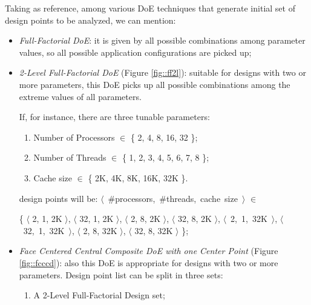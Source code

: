 Taking \cite{natrella2013nist} as reference, among various DoE techniques that generate initial set of design points to be analyzed, we can mention:

\begin{itemize}

    \item \textit{Full-Factorial DoE}: it is given by all possible combinations among parameter values, so all possible application configurations are picked up;
 
    \item \textit{2-Level Full-Factorial DoE} (Figure \ref{fig::ff2l}): suitable for designs with two or more parameters, this DoE picks up all possible combinations among the extreme values of all parameters.
    
    If, for instance, there are three tunable parameters:
    
    \begin{enumerate}
    
        \item Number of Processors $\in$ \{ 2, 4, 8, 16, 32 \};
        
        \item Number of Threads $\in$ \{ 1, 2, 3, 4, 5, 6, 7, 8 \};
        
        \item Cache size $\in$ \{ 2K, 4K, 8K, 16K, 32K \}.
    
    \end{enumerate}
    
    design points will be: \hbox{$\langle$ \#processors, \#threads, cache size $\rangle$} $\in$
    
    \{ $\langle$ 2, 1, 2K $\rangle$, $\langle$ 32, 1, 2K $\rangle$, $\langle$ 2, 8, 2K $\rangle$, $\langle$ 32, 8, 2K $\rangle$, \hbox{$\langle$ 2, 1, 32K $\rangle$}, \hbox{$\langle$ 32, 1, 32K $\rangle$}, $\langle$ 2, 8, 32K $\rangle$, $\langle$ 32, 8, 32K $\rangle$ \};

    \item \textit{Face Centered Central Composite DoE with one Center Point} (Figure \ref{fig::fcccd}): also this DoE is appropriate for designs with two or more parameters. Design point list can be split in three sets:
    
     \begin{enumerate}
    
        \item A 2-Level Full-Factorial Design set;
        

\end{enumerate}
\end{itemize}
